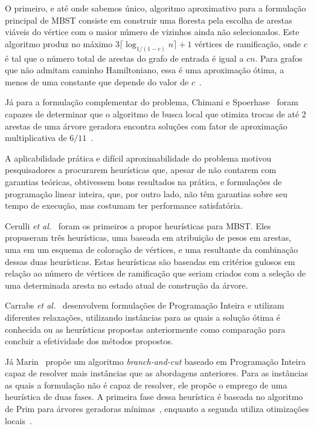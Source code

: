 \documentclass[conference]{IEEEtran}
\begin{document}
O primeiro, e até onde sabemos único, algoritmo aproximativo para a formulação principal de MBST consiste em construir uma floresta pela escolha de arestas viáveis do vértice com o maior número de vizinhos ainda não selecionados.
Este algoritmo produz no máximo $3 \lceil \log_{1/(1 - c)} n \rceil + 1$ vértices de ramificação, onde $c$ é tal que o número total de arestas do grafo de entrada é igual a $cn$.
Para grafos que não admitam caminho Hamiltoniano, essa é uma aproximação ótima, a menos de uma constante que depende do valor de $c$~\cite{salamon2010}.

Já para a formulação complementar do problema, Chimani e Spoerhase~\cite{chimani2015} foram capazes de determinar que o algoritmo de busca local que otimiza trocas de até 2 arestas de uma árvore geradora encontra soluções com fator de aproximação multiplicativa de $6/11$~\cite{chimani2015}.

A aplicabilidade prática e difícil aproximabilidade do problema motivou pesquisadores a procurarem heurísticas que, apesar de não contarem com garantias teóricas, obtivessem bons resultados na prática, e formulações de programação linear inteira, que, por outro lado, não têm garantias sobre seu tempo de execução, mas costumam ter performance satisfatória.

Cerulli \textit{et al.}~\cite{cerulli2009} foram os primeiros a propor heurísticas para MBST.
Eles propuseram três heurísticas, uma baseada em atribuição de pesos em arestas, uma em um esquema de coloração de vértices, e uma resultante da combinação dessas duas heurísticas.
Estas heurísticas são baseadas em critérios gulosos em relação ao número de vértices de ramificação que seriam criados com a seleção de uma determinada aresta no estado atual de construção da árvore.

Carrabs \textit{et al.}~\cite{carrabs2013} desenvolvem formulações de Programação Inteira e utilizam diferentes relaxações, utilizando instâncias para as quais a solução ótima é conhecida ou as heurísticas propostas anteriormente como comparação para concluir a efetividade dos métodos propostos.

Já Marin~\cite{marin2015} propõe um algoritmo \textit{branch-and-cut} baseado em Programação Inteira capaz de resolver mais instâncias que as abordagens anteriores.
Para as instâncias as quais a formulação não é capaz de resolver, ele propõe o emprego de uma heurística de duas fases.
A primeira fase dessa heurística é baseada no algoritmo de Prim para árvores geradoras mínimas~\cite{prim1957}, enquanto a segunda utiliza otimizações locais~\cite{marin2015}.
\end{document}
